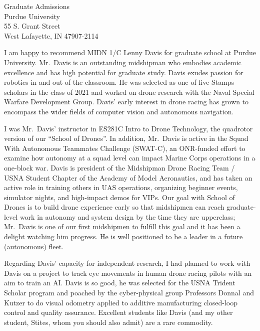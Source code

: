 \documentclass[10pt]{wrceletter}
\date{\today}
\begin{document}
\begin{letter}{%
Graduate Admissions\\
Purdue University\\
55  S. Grant Street\\
West Lafayette, IN 47907-2114}

\opening{}
\raggedright %
\setlength{\parindent}{15pt} %

I am happy to recommend MIDN 1/C Lenny Davis for graduate school at Purdue University.  Mr.~Davis is an outstanding midshipman who embodies academic excellence and has high potential for graduate study. Davis exudes passion for robotics in and out of the classroom. He was selected as one of five Stamps scholars in the class of 2021 and worked on drone research with the Naval Special Warfare Development Group. Davis' early interest in drone racing has grown to encompass the wider fields of computer vision and autonomous navigation.  

I was Mr.~Davis’ instructor in ES281C Intro to Drone Technology, the quadrotor version of our ``School of Drones''. In addition, Mr.~Davis is active in the Squad With Autonomous Teammates Challenge (SWAT-C), an ONR-funded effort to examine how autonomy at a squad level can impact Marine Corps operations in a one-block war. Davis is president of the Midshipman Drone Racing Team / USNA Student Chapter of the Academy of Model Aeronautics, and has taken an active role in training others in UAS operations, organizing beginner events, simulator nights, and high-impact demos for VIPs.  Our goal with School of Drones is to build drone experience early so that midshipmen can reach graduate-level work in autonomy and system design by the time they are upperclass; Mr.~Davis is one of our first midshipmen to fulfill this goal and it has been a delight watching him progress. He is well positioned to be a leader in a future (autonomous) fleet. 

Regarding Davis' capacity for independent research, I had planned to work with Davis on a project to track eye movements in human drone racing pilots with an aim to train an AI.  Davis is so good, he was selected for the USNA Trident Scholar program and poached by the cyber-physical group Professors Donnal and Kutzer to do visual odometry applied to additive manufacturing closed-loop control and quality assurance. Excellent students like Davis (and my other student, Stites, whom you should also admit) are a rare commodity.


\end{letter}
\end{document}
